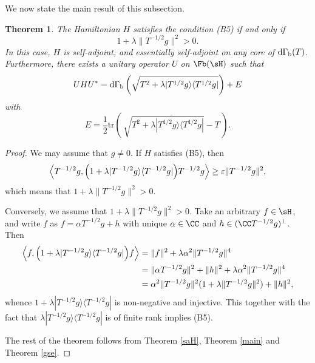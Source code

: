 \documentclass[12pt,draft]{article}
\theoremstyle{plain}
\newtheorem{theorem}{Theorem}[section]
\numberwithin{equation}{section}
\theoremstyle{remark}
\begin{document}
We now state the main result of this subsection.

\begin{theorem}\label{diagonalization of SPIM}
The Hamiltonian $H$ satisfies the condition (B5) if and only if 
\[
1+\lambda\|T^{-1/2}g\|^2>0.
\]
In this case, $H$ is self-adjoint, and essentially self-adjoint on any core of ${\rm d}\Gamma_{\rm b}(T)$.
Furthermore, there exists a unitary operator $U$ on $\Fb(\sH)$ such that 
\[
UHU^*={\rm d}\Gamma_{\rm b}\left(\sqrt{T^2+\lambda|T^{1/2}g\rangle\langle T^{1/2}g|}\right) + E
\]
with
\[
E=\frac{1}{2}\mathrm{tr}\left(\,\overline{\sqrt{T^2+\lambda|T^{1/2}g\rangle\langle T^{1/2}g|}-T}\,\right).
\]
\end{theorem}

\begin{proof}
We may assume that $g\not=0$.
If $H$ satisfies (B5), then 
\[
\left\langle T^{-1/2}g, \Bigl(1+\lambda|T^{-1/2}g\rangle\langle T^{-1/2}g|\Bigr) T^{-1/2}g\right\rangle
\geq \varepsilon\|T^{-1/2}g\|^2,
\]
which means that $1+\lambda\|T^{-1/2}g\|^2>0$.

Conversely, we assume that $1+\lambda\|T^{-1/2}g\|^2>0$.
Take an arbitrary $f\in\sH$, and write $f$ as $f=\alpha T^{-1/2}g+h$ with unique $\alpha\in\CC$ and $h\in (\CC T^{-1/2}g)^{\perp}$.
Then
\begin{align*}
\left\langle f, \Bigl(1+\lambda|T^{-1/2}g\rangle\langle T^{-1/2}g|\Bigr) f\right\rangle
&= \|f\|^2+\lambda\alpha^2\|T^{-1/2}g\|^4\\
&= \|\alpha T^{-1/2}g\|^2+\|h\|^2+\lambda\alpha^2\|T^{-1/2}g\|^4\\
&= \alpha^2\|T^{-1/2}g\|^2(1+\lambda\|T^{-1/2}g\|^2)+\|h\|^2,
\end{align*}
whence $1+\lambda|T^{-1/2}g\rangle\langle T^{-1/2}g|$ is non-negative and injective.
This together with the fact that $\lambda|T^{-1/2}g\rangle\langle T^{-1/2}g|$ is of finite rank implies (B5).

The rest of the theorem follows from Theorem \ref{saH}, Theorem \ref{main} and Theorem \ref{gse}.
\end{proof}
\end{document}
